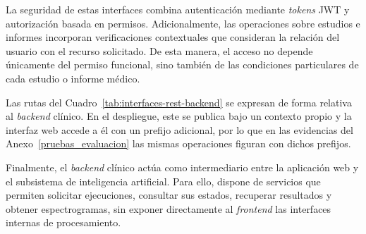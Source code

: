 La seguridad de estas interfaces combina
autenticación mediante \textit{tokens} JWT y autorización
basada en permisos. Adicionalmente, las operaciones
sobre estudios e informes incorporan verificaciones
contextuales que consideran la relación del usuario
con el recurso solicitado. De esta manera, el
acceso no depende únicamente del permiso funcional,
sino también de las condiciones particulares de
cada estudio o informe médico.

Las rutas del Cuadro~\ref{tab:interfaces-rest-backend} se expresan de forma relativa al \textit{backend} clínico.
En el despliegue, este se publica bajo un contexto propio y la interfaz web accede a él con un prefijo adicional, por lo que en las evidencias del Anexo~\ref{pruebas_evaluacion} las mismas operaciones figuran con dichos prefijos.

Finalmente, el \textit{backend} clínico actúa como
intermediario entre la aplicación web y el
subsistema de inteligencia artificial. Para ello,
dispone de servicios que permiten solicitar
ejecuciones, consultar sus estados, recuperar
resultados y obtener espectrogramas, sin exponer
directamente al \textit{frontend} las interfaces internas
de procesamiento.


